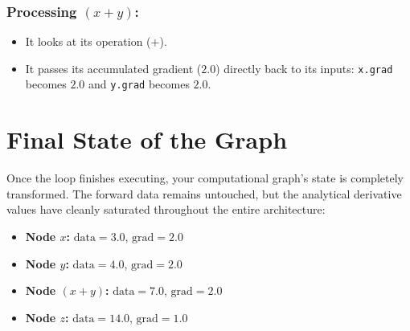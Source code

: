 \documentclass[11pt,a4paper]{article}
\begin{document}
\subsubsection*{Processing $(x+y)$:}
\begin{itemize}
    \item It looks at its operation ($+$).
    \item It passes its accumulated gradient ($2.0$) directly back to its inputs: \texttt{x.grad} becomes $2.0$ and \texttt{y.grad} becomes $2.0$.
\end{itemize}

\section*{Final State of the Graph}
Once the loop finishes executing, your computational graph's state is completely transformed. The forward data remains untouched, but the analytical derivative values have cleanly saturated throughout the entire architecture:
\begin{itemize}
    \item \textbf{Node $x$:} $\text{data}=3.0$, $\text{grad}=2.0$
    \item \textbf{Node $y$:} $\text{data}=4.0$, $\text{grad}=2.0$
    \item \textbf{Node $(x+y)$:} $\text{data}=7.0$, $\text{grad}=2.0$
    \item \textbf{Node $z$:} $\text{data}=14.0$, $\text{grad}=1.0$
\end{itemize}
\end{document}
